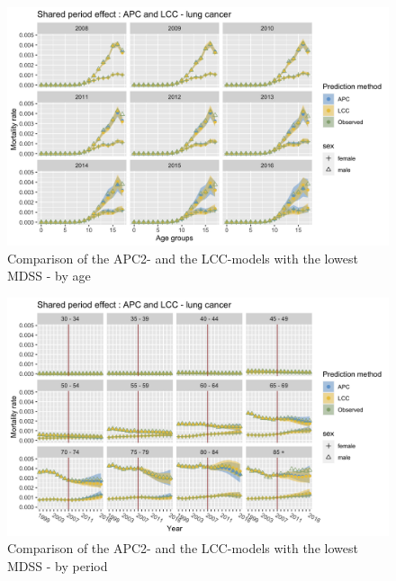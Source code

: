 \begin{figure}[h!]
    \centering
    \includegraphics[width = .8\linewidth]{real-data/real-data-multivariate/Figures/multivariate-comparison-by-age-lung.png}
    \caption{Comparison of the APC2- and the LCC-models with the lowest MDSS - by age}
    \label{fig:mv-LCC-by-period-lung}
\end{figure}

\begin{figure}[h!]
    \centering
    \includegraphics[width = .8\linewidth]{real-data/real-data-multivariate/Figures/multivariate-comparison-by-period-lung.png}
    \caption{Comparison of the APC2- and the LCC-models with the lowest MDSS - by period}
    \label{fig:mv-APC-by-period-lung}
\end{figure}


